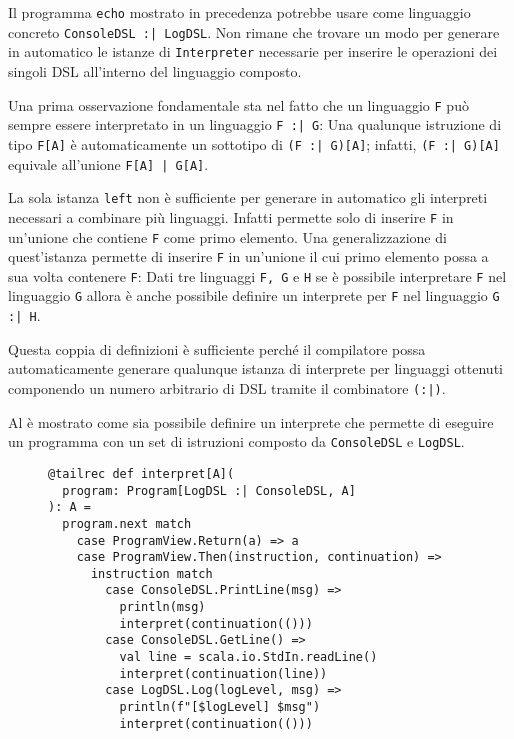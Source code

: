 Il programma \lstinline{echo} mostrato in precedenza potrebbe usare come linguaggio concreto \lstinline{ConsoleDSL :| LogDSL}. Non rimane che trovare un modo per generare in automatico le istanze di \lstinline{Interpreter} necessarie per inserire le operazioni dei singoli DSL all'interno del linguaggio composto.

Una prima osservazione fondamentale sta nel fatto che un linguaggio \lstinline{F} può sempre essere interpretato in un linguaggio \lstinline{F :| G}:
Una qualunque istruzione di tipo \lstinline{F[A]} è automaticamente un sottotipo di \lstinline{(F :| G)[A]}; infatti, \lstinline{(F :| G)[A]} equivale all'unione \lstinline{F[A] | G[A]}.

La sola istanza \lstinline{left} non è sufficiente per generare in automatico gli interpreti necessari a combinare più linguaggi. Infatti permette solo di inserire \lstinline{F} in un'unione che contiene \lstinline{F} come primo elemento. Una generalizzazione di quest'istanza permette di inserire \lstinline{F} in un'unione il cui primo elemento possa a sua volta contenere \lstinline{F}:
Dati tre linguaggi \lstinline{F, G} e \lstinline{H} se è possibile interpretare \lstinline{F} nel linguaggio \lstinline{G} allora è anche possibile definire un interprete per \lstinline{F} nel linguaggio \lstinline{G :| H}.

Questa coppia di definizioni è sufficiente perché il compilatore possa automaticamente generare qualunque istanza di interprete per linguaggi ottenuti componendo un numero arbitrario di DSL tramite il combinatore \lstinline{(:|)}.

Al  è mostrato come sia possibile definire un interprete che permette di eseguire un programma con un set di istruzioni composto da \lstinline{ConsoleDSL} e \lstinline{LogDSL}.

\begin{figure}[htp]
  \begin{lstlisting}[language=scala3, caption={Esempio di interpretazione di un programma composto da più DSL. Il \emph{pattern matching} sulle istruzioni permette di gestire istruzioni provenienti da entrambi i DSL di base.}, label={lst:echo}]
@tailrec def interpret[A](
  program: Program[LogDSL :| ConsoleDSL, A]
): A =
  program.next match
    case ProgramView.Return(a) => a
    case ProgramView.Then(instruction, continuation) =>
      instruction match
        case ConsoleDSL.PrintLine(msg) =>
          println(msg)
          interpret(continuation(()))
        case ConsoleDSL.GetLine() =>
          val line = scala.io.StdIn.readLine()
          interpret(continuation(line))
        case LogDSL.Log(logLevel, msg) =>
          println(f"[$logLevel] $msg")
          interpret(continuation(()))
  \end{lstlisting}
\end{figure}


